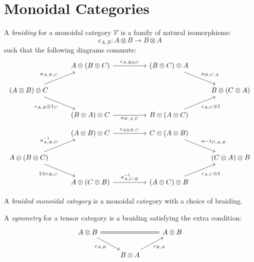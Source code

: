 \documentclass[8pt]{article}
\theoremstyle{definition}
\theoremstyle{definition}
\theoremstyle{definition}
\theoremstyle{definition}
\theoremstyle{definition}
\theoremstyle{definition}
\theoremstyle{definition}
\theoremstyle{definition}
\theoremstyle{definition}
\theoremstyle{definition}
\theoremstyle{definition}
\theoremstyle{definition}
\theoremstyle{definition}
\theoremstyle{definition}
\theoremstyle{question}
\begin{document}
\section{Monoidal Categories}

A \emph{braiding} for a monoidal category $\mathcal{V}$ is a family of natural isomorphisms:
\[
c_{A, B} : A \otimes B \to B \otimes A
\]
such that the following diagrams commute:
\[
\begin{tikzcd}
  & A \otimes (B \otimes C) \ar[rr, "c_{A, B \otimes C}"] && (B \otimes C) \otimes A \ar[dr, "a_{B,C,A}"] \\
  (A \otimes B) \otimes C \ar[ur, "a_{A,B,C}"] \ar[dr, "c_{A,B} \otimes 1_C"'] &&&& B \otimes (C \otimes A) \\
  & (B \otimes A) \otimes C \ar[rr, "a_{B,A,C}"'] && B \otimes (A \otimes C) \ar[ur, "c_{A,C} \otimes 1"']
\end{tikzcd}
\]
\[
\begin{tikzcd}
  & (A \otimes B) \otimes C \ar[rr, "c_{A \otimes B, C}"] && C \otimes (A \otimes B) \ar[dr, "a{-1}_{C,A,B}"] \\
  A \otimes (B \otimes C) \ar[ur, "a^{-1}_{A,B,C}"] \ar[dr, "1 \otimes c_{B,C}"'] &&&& (C \otimes A) \otimes B \\
  & A \otimes (C \otimes B) \ar[rr, "a^{-1}_{A,C,B}"] && (A \otimes C) \otimes B \ar[ur, "c_{A,C} \otimes 1"']
\end{tikzcd}
\]

A \emph{braided monoidal category} is a monoidal category with a choice of braiding.

A \emph{symmetry} for a tensor category is a braiding satisfying the extra condition:
\[
\begin{tikzcd}
  A \otimes B \ar[dr, "c_{A,B}"'] \ar[rr, equal] && A \otimes B \\
  & B \otimes A \ar[ur, "c_{B, A}"'] 
\end{tikzcd}
\]
\end{document}
